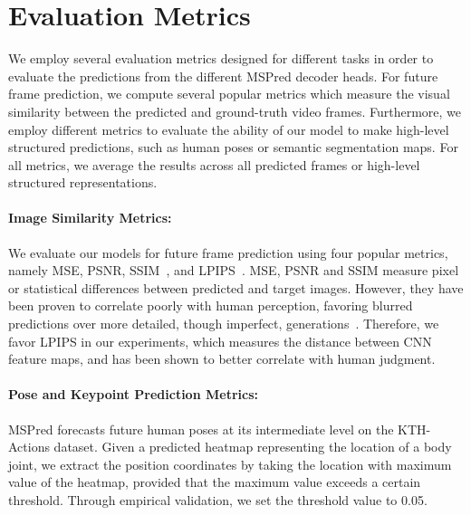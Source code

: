 \documentclass{bmvc2k}
\begin{document}
\section{Evaluation Metrics}
\label{section: evaluation metrics}

We employ several evaluation metrics designed for different tasks 
in order to evaluate the predictions from the different MSPred decoder heads.
For future frame prediction, we compute several popular metrics which measure the visual
similarity between the predicted and ground-truth video frames. 
Furthermore, we employ different metrics to evaluate the ability of our model to make high-level structured predictions, such as human poses or semantic segmentation maps.
For all metrics, we average the results across all predicted frames or high-level structured representations.

\paragraph{Image Similarity Metrics:}  We evaluate our models for future frame
prediction using four popular metrics, namely MSE, PSNR, SSIM~\cite{Wang_SSIM_2004}, 
and LPIPS~\cite{Zhang_TheUnreasonableEffectivenessOfDeepFeaturesLPIPS_2018}.
MSE, PSNR and SSIM measure pixel or statistical differences between predicted and target images. However, they have been proven to correlate poorly with human perception,
favoring blurred predictions over more detailed, though imperfect, generations~\cite{Zhang_TheUnreasonableEffectivenessOfDeepFeaturesLPIPS_2018, Sara_ImageQualityAssesmentThroughSSIMMSEPSNTStudy_2019}.
Therefore, we favor LPIPS in our experiments, which measures the distance between CNN feature maps, and has been shown to better correlate with human judgment.


\vspace*{-0cm}
\paragraph{Pose and Keypoint Prediction Metrics:} MSPred forecasts future human poses at its intermediate level on the KTH-Actions dataset.
Given a predicted heatmap representing the location of a body joint, we extract the position coordinates by taking the location with maximum value of the heatmap, provided that the maximum value exceeds a certain threshold. Through empirical validation, we set the threshold value to 0.05.
\end{document}
